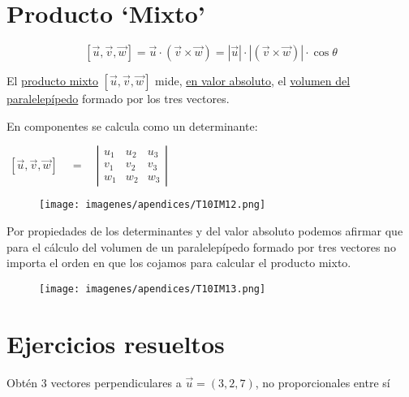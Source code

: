 \section{Producto `Mixto'}
\begin{equation}
\boxed{ \ [\vec u, \vec v, \vec w]=\vec u \cdot (\vec v \times \vec w)=|\vec u|\cdot|(\vec v \times \vec w)|\cdot \cos \theta \ }
\end{equation}

\begin{multicols}{2}
El \underline{producto mixto} $[\vec u, \vec v, \vec w]$ mide, \underline{en valor absoluto}, el \underline{volumen del paralelepípedo} formado por los tres vectores.
				
En componentes se calcula como un determinante:
				
$\boxed{ \ [\overrightarrow { u } ,\overrightarrow { v }, \overrightarrow { w }]  \quad =\quad \left| \begin{matrix} u_{ 1 } & u_{ 2 } & u_{ 3 } \\ v_{ 1 } & v_{ 2 } & v_{ 3 } \\ w_{ 1 } & w_{ 2 } & w_{ 3 } \end{matrix} \right| \ } $

\begin{figure}[H]
	\centering
	\texttt{[image: imagenes/apendices/T10IM12.png]}
\end{figure}
\end{multicols}

\begin{multicols}{2}
Por propiedades de los determinantes y del valor absoluto podemos afirmar que para el cálculo del volumen de un paralelepípedo formado por tres vectores no importa el orden en que los cojamos para calcular el producto mixto.
\begin{figure}[H]
	\centering
	\texttt{[image: imagenes/apendices/T10IM13.png]}
\end{figure}
\end{multicols}


\section{Ejercicios resueltos}


\begin{ejre}
	Obtén 3 vectores perpendiculares a $\vec u=(3,2,7)$, no proporcionales entre sí
\end{ejre}

